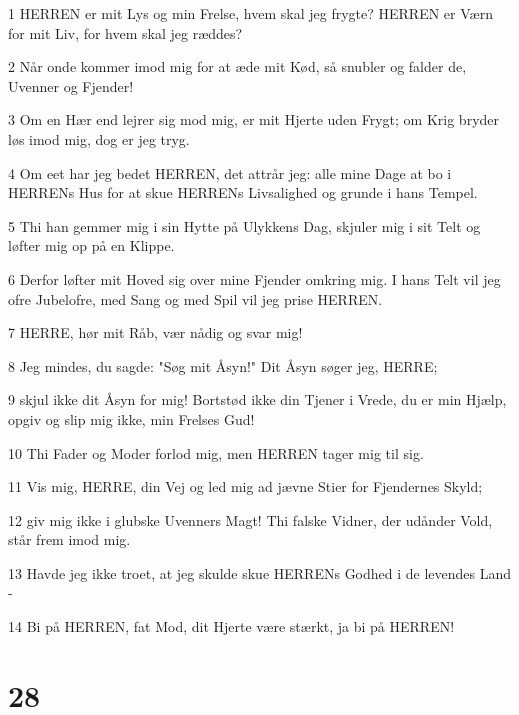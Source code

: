 \par 1 HERREN er mit Lys og min Frelse, hvem skal jeg frygte? HERREN er Værn for mit Liv, for hvem skal jeg ræddes?
\par 2 Når onde kommer imod mig for at æde mit Kød, så snubler og falder de, Uvenner og Fjender!
\par 3 Om en Hær end lejrer sig mod mig, er mit Hjerte uden Frygt; om Krig bryder løs imod mig, dog er jeg tryg.
\par 4 Om eet har jeg bedet HERREN, det attrår jeg: alle mine Dage at bo i HERRENs Hus for at skue HERRENs Livsalighed og grunde i hans Tempel.
\par 5 Thi han gemmer mig i sin Hytte på Ulykkens Dag, skjuler mig i sit Telt og løfter mig op på en Klippe.
\par 6 Derfor løfter mit Hoved sig over mine Fjender omkring mig. I hans Telt vil jeg ofre Jubelofre, med Sang og med Spil vil jeg prise HERREN.
\par 7 HERRE, hør mit Råb, vær nådig og svar mig!
\par 8 Jeg mindes, du sagde: "Søg mit Åsyn!" Dit Åsyn søger jeg, HERRE;
\par 9 skjul ikke dit Åsyn for mig! Bortstød ikke din Tjener i Vrede, du er min Hjælp, opgiv og slip mig ikke, min Frelses Gud!
\par 10 Thi Fader og Moder forlod mig, men HERREN tager mig til sig.
\par 11 Vis mig, HERRE, din Vej og led mig ad jævne Stier for Fjendernes Skyld;
\par 12 giv mig ikke i glubske Uvenners Magt! Thi falske Vidner, der udånder Vold, står frem imod mig.
\par 13 Havde jeg ikke troet, at jeg skulde skue HERRENs Godhed i de levendes Land -
\par 14 Bi på HERREN, fat Mod, dit Hjerte være stærkt, ja bi på HERREN!

\chapter{28}

